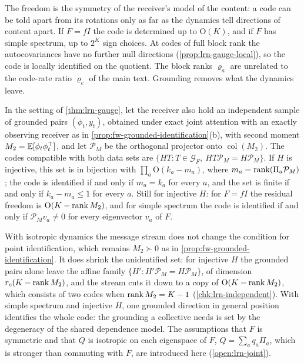The freedom is the symmetry of the receiver's model of the content: a code can be told apart from its rotations only as far as the dynamics tell directions of content apart. If $F=fI$ the code is determined up to $\mathrm O(K)$, and if $F$ has simple spectrum, up to $2^K$ sign choices. At codes of full block rank the autocovariances have no further null directions (\cref{prop:lrn-gauge-local}), so the code is locally identified on the quotient. The block ranks $\varrho_a$ are unrelated to the code-rate ratio $\varrho_c$ of the main text. Grounding removes what the dynamics leave.

\begin{corollary}\label{cor:lrn-gauge-grounding}
In the setting of \cref{thm:lrn-gauge}, let the receiver also hold an independent sample of grounded pairs $(\phi_t,y_t)$, obtained under exact joint attention with an exactly observing receiver as in \cref{prop:fw-grounded-identification}(b), with second moment $M_2=\mathbb{E}[\phi_t\phi_t^\top]$, and let $\mathcal P_M$ be the orthogonal projector onto $\operatorname{col}(M_2)$. The codes compatible with both data sets are $\{HT:T\in\mathcal G_F,\ HT\mathcal P_M=H\mathcal P_M\}$. If $H$ is injective, this set is in bijection with $\prod_a\mathrm O(k_a-m_a)$, where $m_a=\operatorname{rank}(\Pi_a\mathcal P_M)$; the code is identified if and only if $m_a=k_a$ for every $a$, and the set is finite if and only if $k_a-m_a\le1$ for every $a$. Still for injective $H$: for $F=fI$ the residual freedom is $\mathrm O(K-\operatorname{rank} M_2)$, and for simple spectrum the code is identified if and only if $\mathcal P_Mv_a\ne0$ for every eigenvector $v_a$ of $F$.
\end{corollary}

With isotropic dynamics the message stream does not change the condition for point identification, which remains $M_2\succ0$ as in \cref{prop:fw-grounded-identification}. It does shrink the unidentified set: for injective $H$ the grounded pairs alone leave the affine family $\{H':H'\mathcal P_M=H\mathcal P_M\}$, of dimension $r_c(K-\operatorname{rank} M_2)$, and the stream cuts it down to a copy of $\mathrm O(K-\operatorname{rank} M_2)$, which consists of two codes when $\operatorname{rank} M_2=K-1$ (\cref{chk:lrn-independent}). With simple spectrum and injective $H$, one grounded direction in general position identifies the whole code: the grounding a collective needs is set by the degeneracy of the shared dependence model. The assumptions that $F$ is symmetric and that $Q$ is isotropic on each eigenspace of $F$, $Q=\sum_aq_a\Pi_a$, which is stronger than commuting with $F$, are introduced here (\cref{open:lrn-joint}).

